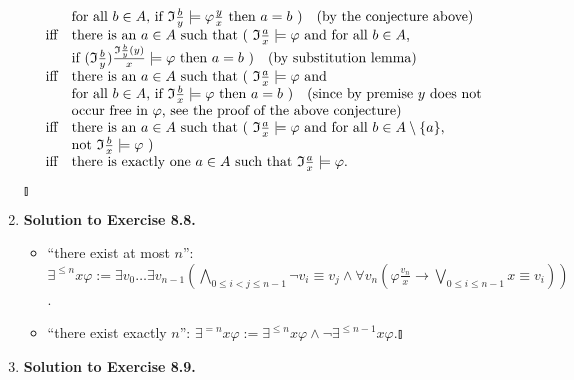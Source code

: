 \begin{enumerate}[1.]
\[\begin{array}{ll}
\, & \mbox{for all $b \in A$, if $\mathfrak{I} \frac{b}{y} \models \varphi \frac{y}{x}$ then $a = b$ ) \,\, (by the conjecture above)} \\
\mbox{iff} & \mbox{there is an $a \in A$ such that ( $\mathfrak{I} \frac{a}{x} \models \varphi$ and for all $b \in A$,} \\
\, & \mbox{if $(\mathfrak{I} \frac{b}{y}) \frac{\mathfrak{I} \frac{b}{y} (y) }{x} \models \varphi$ then $a = b$ ) \,\, (by substitution lemma)} \\
\mbox{iff} & \mbox{there is an $a \in A$ such that ( $\mathfrak{I} \frac{a}{x} \models \varphi$ and} \\
\, & \mbox{for all $b \in A$, if $\mathfrak{I} \frac{b}{x} \models \varphi$ then $a = b$ ) \,\, (since by premise $y$ does not} \\
\, & \mbox{occur free in $\varphi$, see the proof of the above conjecture)} \\
\mbox{iff} & \mbox{there is an $a \in A$ such that ( $\mathfrak{I} \frac{a}{x} \models \varphi$ and for all $b \in A \setminus \{ a \}$,} \\
\, & \mbox{not $\mathfrak{I} \frac{b}{x} \models \varphi$ )} \\
\mbox{iff} & \mbox{there is exactly one $a \in A$ such that $\mathfrak{I} \frac{a}{x} \models \varphi$.}
\end{array}
\] \begin{flushright}$\talloblong$\end{flushright}
%
\item \textbf{Solution to Exercise 8.8.}
\begin{itemize}
\item ``there exist at most $n$'': $\displaystyle \exists^{\leq n} x \varphi := \exists v_0 \ldots \exists v_{n-1}(\bigwedge_{0 \leq i < j \leq n - 1} \neg v_i \equiv v_j \land \forall v_n (\varphi \frac{v_n}{x} \rightarrow \bigvee_{0 \leq i \leq n - 1} x \equiv v_i))$.
\item ``there exist exactly $n$'': $\displaystyle \exists^{=n} x \varphi := \exists^{\leq n } x \varphi \land \neg \exists^{\leq n - 1} x \varphi$.\nolinebreak\hfill$\talloblong$
\end{itemize}
%
\item \textbf{Solution to Exercise 8.9.}

\end{enumerate}
